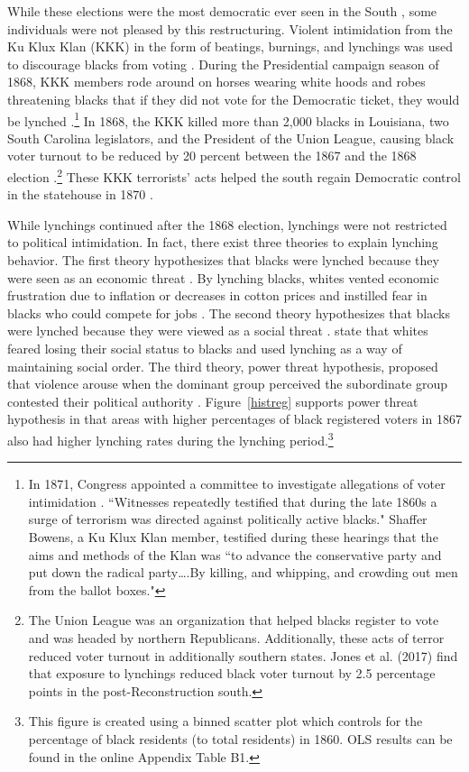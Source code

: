 \documentclass[AEJ, finalmode]{AEA}
\begin{document}
While these elections were the most democratic ever seen in the South \cite{dubois1935black}, some individuals were not pleased by this restructuring. Violent intimidation from the Ku Klux Klan (KKK) in the form of beatings, burnings, and lynchings was used to discourage blacks from voting \cite{defina2011legacy}. During the Presidential campaign season of 1868, KKK members rode around on horses wearing white hoods and robes threatening blacks that if they did not vote for the Democratic ticket, they would be lynched \cite{dickerson2003reconstruction}.\footnote{In 1871, Congress appointed a committee to investigate allegations of voter intimidation \cite{tolnay1995festival}. ``Witnesses repeatedly testified that during the late 1860s a surge of terrorism was directed against politically active blacks." Shaffer Bowens, a Ku Klux Klan member, testified during these hearings that the aims and methods of the Klan was ``to advance the conservative party and put down the radical party….By killing, and whipping, and crowding out men from the ballot boxes."} In 1868, the KKK killed more than 2,000 blacks in Louisiana, two South Carolina legislators, and the President of the Union League, causing black voter turnout to be reduced by 20 percent between the 1867 and the 1868 election \cite{dickerson2003reconstruction,jones2017political}.\footnote{The Union League was an organization that helped blacks register to vote and was headed by northern Republicans. Additionally, these acts of terror reduced voter turnout in additionally southern states. Jones et al. (2017) find that exposure to lynchings reduced black voter turnout by 2.5 percentage points in the post-Reconstruction south.} These KKK terrorists' acts helped the south regain Democratic control in the statehouse in 1870 \cite{dickerson2003reconstruction}. 

While lynchings continued after the 1868 election, lynchings were not restricted to political intimidation. In fact, there exist three theories to explain lynching behavior. The first theory hypothesizes that blacks were lynched because they were seen as an economic threat \cite{beck1992season,cook_logan_parman}. By lynching blacks, whites vented economic frustration due to inflation or decreases in cotton prices \cite{defina2011legacy} and instilled fear in blacks who could compete for jobs \cite{cook_logan_parman}. The second theory hypothesizes that blacks were lynched because they were viewed as a social threat \cite{price2008does,cook_logan_parman}.  state that whites feared losing their social status to blacks and used lynching as a way of maintaining social order. The third theory,  power threat hypothesis, proposed that violence arouse when the dominant group perceived the subordinate group contested their political authority \cite{price2008does}. Figure~\ref{histreg} supports  power threat hypothesis in that areas with higher percentages of black registered voters in 1867 also had higher lynching rates during the lynching period.\footnote{This figure is created using a binned scatter plot which controls for the percentage of black residents (to total residents) in 1860. OLS results can be found in the online Appendix Table B1.}  
\end{document}
